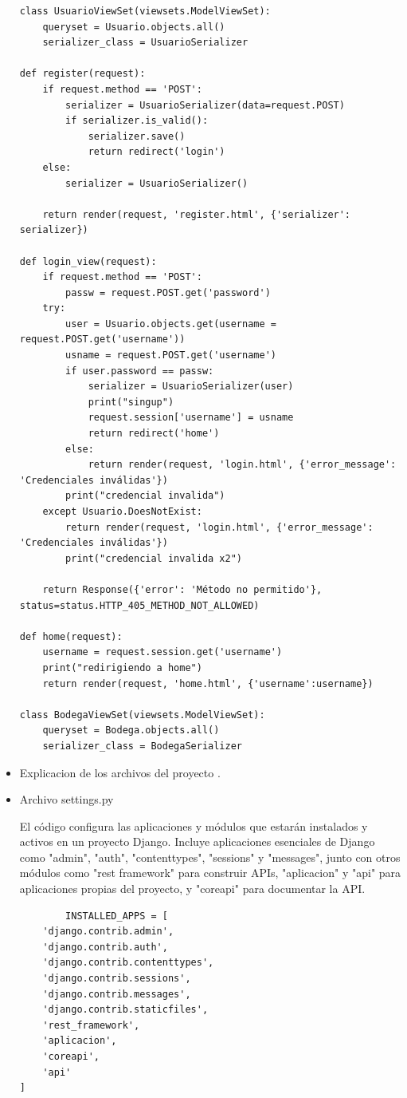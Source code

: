\documentclass{article}
\begin{document}
\begin{itemize}
\begin{lstlisting}
class UsuarioViewSet(viewsets.ModelViewSet):
    queryset = Usuario.objects.all()
    serializer_class = UsuarioSerializer
    
def register(request):
    if request.method == 'POST':
        serializer = UsuarioSerializer(data=request.POST)
        if serializer.is_valid():
            serializer.save()
            return redirect('login')
    else:
        serializer = UsuarioSerializer()

    return render(request, 'register.html', {'serializer': serializer})

def login_view(request):
    if request.method == 'POST':
        passw = request.POST.get('password')
    try:
        user = Usuario.objects.get(username = request.POST.get('username'))
        usname = request.POST.get('username')
        if user.password == passw:
            serializer = UsuarioSerializer(user)
            print("singup")
            request.session['username'] = usname
            return redirect('home')
        else:
            return render(request, 'login.html', {'error_message': 'Credenciales inválidas'})
        print("credencial invalida")
    except Usuario.DoesNotExist:
        return render(request, 'login.html', {'error_message': 'Credenciales inválidas'})
        print("credencial invalida x2")

    return Response({'error': 'Método no permitido'}, status=status.HTTP_405_METHOD_NOT_ALLOWED)

def home(request):
    username = request.session.get('username')
    print("redirigiendo a home")
    return render(request, 'home.html', {'username':username})
    
class BodegaViewSet(viewsets.ModelViewSet):
    queryset = Bodega.objects.all()
    serializer_class = BodegaSerializer
  \end{lstlisting}


   \item Explicacion de los archivos del proyecto
    .
   \item Archivo settings.py
     
       El código configura las aplicaciones y módulos que estarán instalados y activos en un proyecto Django. Incluye aplicaciones esenciales de Django como "admin", "auth", "contenttypes", "sessions" y "messages", junto con otros módulos como "rest framework" para construir APIs, "aplicacion" y "api" para aplicaciones propias del proyecto, y "coreapi" para documentar la API.
        \begin{lstlisting}
        INSTALLED_APPS = [
    'django.contrib.admin',
    'django.contrib.auth',
    'django.contrib.contenttypes',
    'django.contrib.sessions',
    'django.contrib.messages',
    'django.contrib.staticfiles',
    'rest_framework',
    'aplicacion',
    'coreapi', 
    'api'
]


\end{lstlisting}
\end{itemize}
\end{document}
